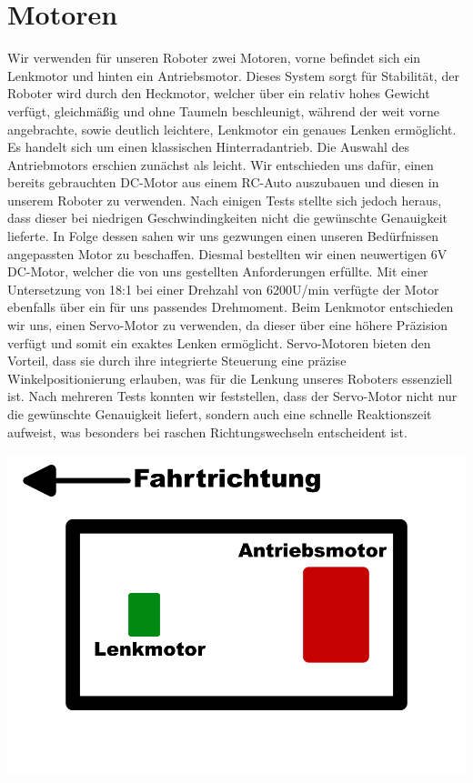 \documentclass{article}
\begin{document}
\section{Motoren}
Wir verwenden für unseren Roboter zwei Motoren, vorne befindet sich ein Lenkmotor und hinten ein Antriebsmotor.
Dieses System sorgt für Stabilität, der Roboter wird durch den Heckmotor, welcher über ein relativ hohes Gewicht verfügt,
gleichmäßig und ohne Taumeln beschleunigt, während der weit vorne angebrachte, sowie deutlich leichtere, Lenkmotor ein genaues Lenken ermöglicht.
Es handelt sich um einen klassischen Hinterradantrieb.\newline
Die Auswahl des Antriebmotors erschien zunächst als leicht. Wir entschieden uns dafür, einen bereits gebrauchten DC-Motor aus einem RC-Auto auszubauen und
diesen in unserem Roboter zu verwenden. Nach einigen Tests stellte sich jedoch heraus, dass dieser bei niedrigen Geschwindingkeiten nicht
die gewünschte Genauigkeit lieferte.\newline
In Folge dessen sahen wir uns gezwungen einen unseren Bedürfnissen angepassten Motor zu beschaffen.
Diesmal bestellten wir einen neuwertigen 6V DC-Motor, welcher die von uns gestellten Anforderungen erfüllte.
Mit einer Untersetzung von 18:1 bei einer Drehzahl von 6200U/min verfügte der Motor ebenfalls über ein für uns passendes Drehmoment.\newline
Beim Lenkmotor entschieden wir uns, einen Servo-Motor zu verwenden, da dieser über eine höhere Präzision verfügt und somit ein exaktes Lenken ermöglicht.
Servo-Motoren bieten den Vorteil, dass sie durch ihre integrierte Steuerung eine präzise Winkelpositionierung erlauben,
was für die Lenkung unseres Roboters essenziell ist. Nach mehreren Tests konnten wir feststellen,
dass der Servo-Motor nicht nur die gewünschte Genauigkeit liefert, sondern auch eine schnelle Reaktionszeit aufweist,
was besonders bei raschen Richtungswechseln entscheident ist.\newline
\begin{center}
  \includegraphics[scale=0.3]{motoren_position.png}
\end{center}
\end{document}
